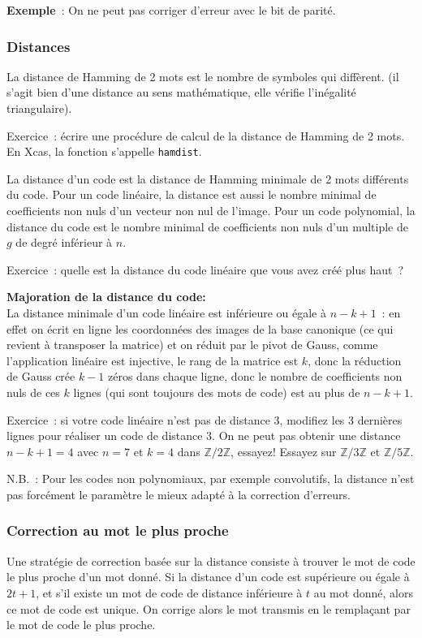 \documentclass[a4paper,11pt]{article}
\newcommand{\Z}{{\mathbb{Z}}}
\begin{document}
{\bf Exemple}~: On ne peut pas corriger d'erreur avec le bit de parité.

\subsubsection{Distances} 
La distance de Hamming de 2 mots est le nombre de symboles qui diffèrent.
(il s'agit bien d'une distance au sens mathématique, 
elle v\'erifie l'in\'egalit\'e triangulaire). 

Exercice~: écrire une procédure de calcul de la distance de Hamming
de 2 mots. En Xcas, la fonction s'appelle {\tt hamdist}.

La distance d'un code est la distance de Hamming minimale
de 2 mots diff\'erents du code.
Pour un code lin\'eaire, la distance est aussi le nombre minimal
de coefficients non nuls d'un vecteur non nul de l'image.
Pour un code polynomial, la distance du code
est le nombre minimal de coefficients non nuls d'un multiple
de $g$ de degr\'e inf\'erieur \`a $n$.

Exercice~: quelle est la distance du code linéaire que
vous avez créé plus haut~?

{\bf Majoration de la distance du code:}\\
La distance minimale d'un code lin\'eaire est inf\'erieure ou 
\'egale \`a $n-k+1$~: en effet on écrit en ligne les coordonnées
des images de la base canonique (ce qui revient \`a transposer la
matrice) et on réduit par le pivot de Gauss,
comme l'application linéaire est injective, le rang de la matrice
est $k$, donc la réduction de Gauss crée $k-1$
zéros dans chaque ligne, donc le nombre de coefficients non nuls
de ces $k$ lignes (qui sont toujours des mots de code) est 
au plus de $n-k+1$.

Exercice~: si votre code linéaire n'est pas de distance 3, modifiez
les 3 dernières lignes pour réaliser un code de distance 3. On
ne peut pas obtenir une distance $n-k+1=4$ avec $n=7$ et $k=4$ 
dans $\Z/2\Z$, essayez! Essayez sur $\Z/3\Z$ et $\Z/5\Z$.

N.B.~: Pour les codes non
polynomiaux, par exemple convolutifs, la distance n'est pas
forc\'ement le
param\`etre le mieux adapt\'e \`a la correction d'erreurs.

\subsubsection{Correction au mot le plus proche}
Une strat\'egie de correction bas\'ee sur la distance consiste \`a
trouver le mot de code le plus proche d'un mot donn\'e.
Si la distance d'un code est sup\'erieure ou \'egale
\`a $2t+1$, et s'il existe un mot de code de distance inf\'erieure
\`a $t$ au mot donn\'e, alors ce mot de code est unique.
On corrige alors le mot transmis en le remplaçant par le mot de code
le plus proche.
\end{document}
